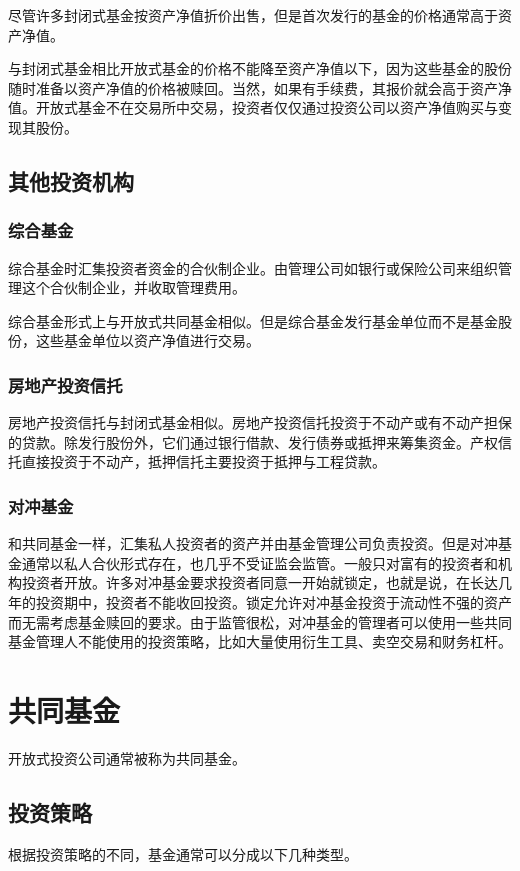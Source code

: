 \documentclass{article}
\begin{document}
尽管许多封闭式基金按资产净值折价出售，但是首次发行的基金的价格通常高于资产净值。

与封闭式基金相比开放式基金的价格不能降至资产净值以下，因为这些基金的股份随时准备以资产净值的价格被赎回。当然，如果有手续费，其报价就会高于资产净值。开放式基金不在交易所中交易，投资者仅仅通过投资公司以资产净值购买与变现其股份。

\subsection{其他投资机构}
\subsubsection{综合基金}
综合基金时汇集投资者资金的合伙制企业。由管理公司如银行或保险公司来组织管理这个合伙制企业，并收取管理费用。

综合基金形式上与开放式共同基金相似。但是综合基金发行基金单位而不是基金股份，这些基金单位以资产净值进行交易。

\subsubsection{房地产投资信托}
房地产投资信托与封闭式基金相似。房地产投资信托投资于不动产或有不动产担保的贷款。除发行股份外，它们通过银行借款、发行债券或抵押来筹集资金。产权信托直接投资于不动产，抵押信托主要投资于抵押与工程贷款。

\subsubsection{对冲基金}
和共同基金一样，汇集私人投资者的资产并由基金管理公司负责投资。但是对冲基金通常以私人合伙形式存在，也几乎不受证监会监管。一般只对富有的投资者和机构投资者开放。许多对冲基金要求投资者同意一开始就锁定，也就是说，在长达几年的投资期中，投资者不能收回投资。锁定允许对冲基金投资于流动性不强的资产而无需考虑基金赎回的要求。由于监管很松，对冲基金的管理者可以使用一些共同基金管理人不能使用的投资策略，比如大量使用衍生工具、卖空交易和财务杠杆。

\section{共同基金}
开放式投资公司通常被称为共同基金。

\subsection{投资策略}
根据投资策略的不同，基金通常可以分成以下几种类型。
\end{document}
